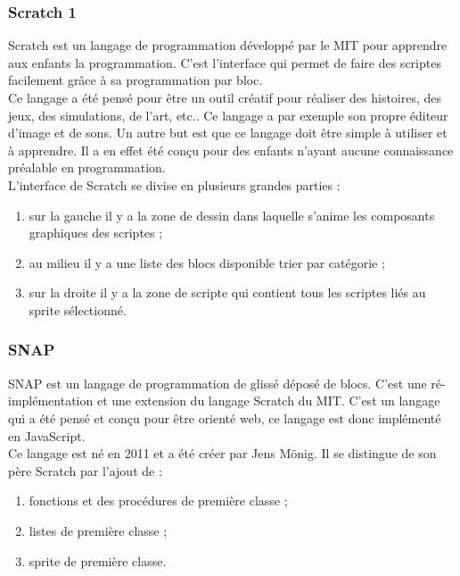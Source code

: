 \subsubsection{Scratch 1}
Scratch est un langage de programmation développé par le MIT pour apprendre aux enfants la programmation. C'est l'interface qui permet de faire des scriptes facilement grâce à sa programmation par bloc.\\

Ce langage a été pensé pour être un outil créatif pour réaliser des histoires, des jeux, des simulations, de l'art, etc.. Ce langage a par exemple son propre éditeur d'image et de sons. Un autre but est que ce langage doit être simple à utiliser et à apprendre. Il a en effet été conçu pour des enfants n'ayant aucune connaissance préalable en programmation.\\

L'interface de Scratch se divise en plusieurs grandes parties :

\begin{enumerate}
\item sur la gauche il y a la zone de dessin dans laquelle s'anime les composants graphiques des scriptes ;
\item au milieu il y a une liste des blocs disponible trier par catégorie ;
\item sur la droite il y a la zone de scripte qui contient tous les scriptes liés au sprite sélectionné.
\end{enumerate}

\subsubsection{SNAP}
SNAP est un langage de programmation de glissé déposé de blocs. C'est une ré-implémentation et une extension du langage Scratch du MIT. C'est un langage qui a été pensé et conçu pour être orienté web, ce langage est donc implémenté en JavaScript.\\

Ce langage est né en 2011 et a été créer par Jens Mönig. Il se distingue de son père Scratch par l'ajout de :
\begin{enumerate}
\item fonctions et des procédures de première classe ;
\item listes de première classe ;
\item sprite de première classe.
\end{enumerate}

